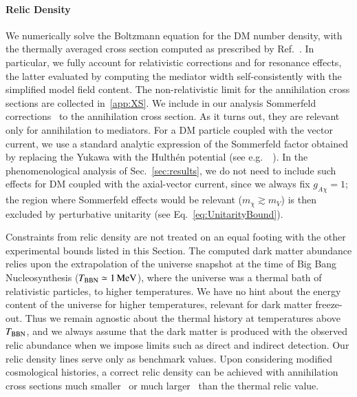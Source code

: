 \documentclass[final,5p,twocolumn]{elsarticle}
\newcommand{\Eq}[1]{Eq.~\eqref{#1}}
\newcommand{\Ref}[1]{Ref.~\cite{#1}}
\begin{document}
\paragraph{Relic Density} We numerically solve the Boltzmann equation for the DM number density, with the thermally averaged cross section computed as prescribed by \Ref{Gondolo:1990dk}. In particular, we fully account for relativistic corrections and for resonance effects, the latter evaluated by computing the mediator width self-consistently with the simplified model field content. The non-relativistic limit for the annihilation cross sections are collected in~\ref{app:XS}. We include in our analysis Sommerfeld corrections~\cite{Hisano:2004ds} to the annihilation cross section. As it turns out, they are relevant only for annihilation to mediators. For a DM particle coupled with the vector current, we use a standard analytic expression of the Sommerfeld factor obtained by replacing the Yukawa with the  Hulth\'en potential (see e.g.~~\cite{Cassel:2009wt,Slatyer:2009vg,Cirelli:2016rnw}). In the phenomenological analysis of Sec.~\ref{sec:results}, we do not need to include such effects for DM coupled with the axial-vector current, since we always fix $g_{A \chi} = 1$; the region where Sommerfeld effects would be relevant ($m_\chi \gtrsim m_V$) is then excluded by perturbative unitarity (see \Eq{eq:UnitarityBound}). 

Constraints from relic density are not treated on an equal footing with the other experimental bounds listed in this Section. The computed dark matter abundance relies upon the extrapolation of the universe snapshot at the time of Big Bang Nucleosynthesis ($T_{\rm BBN} \simeq 1 \, {\rm MeV}$), where the universe was a thermal bath of relativistic particles, to higher temperatures. We have no hint about the energy content of the universe for higher temperatures, relevant for dark matter freeze-out. Thus we remain agnostic about the thermal history at temperatures above $T_{\rm BBN}$, and we always assume that the dark matter is produced with the observed relic abundance when we impose limits such as direct and indirect detection. Our relic density lines serve only as benchmark values. Upon considering modified cosmological histories, a correct relic density can be achieved with annihilation cross sections much smaller~\cite{McDonald:1989jd,Kamionkowski:1990ni,Chung:1998rq,Giudice:2000ex} or much larger~\cite{Profumo:2003hq,Salati:2002md,DEramo:2017gpl} than the thermal relic value. 
\end{document}
